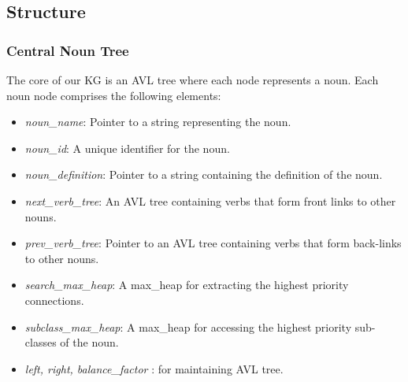 \documentclass[conference]{IEEEtran}
\begin{document}
\subsection{Structure}

\subsubsection{Central Noun Tree}
The core of our KG is an AVL tree where each node represents a noun. Each noun node comprises the following elements:
\begin{itemize}

    \item \textit{noun\_name}: Pointer to a string representing the noun.
    \item \textit{noun\_id}: A unique identifier for the noun.
    \item \textit{noun\_definition}: Pointer to a string containing the definition of the noun.
    \item \textit{next\_verb\_tree}: An AVL tree containing verbs that form front links to other nouns.
    \item \textit{prev\_verb\_tree}: Pointer to an AVL tree containing verbs that form back-links to other nouns.
    \item \textit{search\_max\_heap}: A max\_heap for extracting the highest priority connections.
    \item \textit{subclass\_max\_heap}: A max\_heap for accessing the highest priority sub-classes of the noun.
    \item \textit{left, right, balance\_factor} : for maintaining AVL tree. 
    
\end{itemize}
\end{document}
